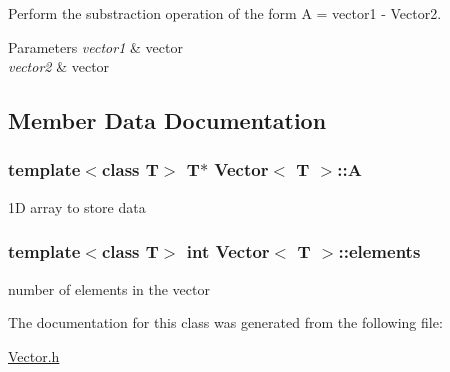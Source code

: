 Perform the substraction operation of the form A = vector1 -\/ Vector2. 


\begin{DoxyParams}{Parameters}
{\em vector1} & vector\\
\hline
{\em vector2} & vector \\
\hline
\end{DoxyParams}


\subsection{Member Data Documentation}
\hypertarget{class_vector_ac1512c9d8f28d4253e52967d64b803d9}{}
\subsubsection[{A}]{\setlength{\rightskip}{0pt plus 5cm}template$<$class T$>$ T$\ast$ {\bf Vector}$<$ T $>$\+::A\hspace{0.3cm}{\ttfamily [private]}}\label{class_vector_ac1512c9d8f28d4253e52967d64b803d9}


1\+D array to store data 

\hypertarget{class_vector_aac9657cb0934d133a2d9868f0661ac01}{}
\subsubsection[{elements}]{\setlength{\rightskip}{0pt plus 5cm}template$<$class T$>$ int {\bf Vector}$<$ T $>$\+::elements\hspace{0.3cm}{\ttfamily [private]}}\label{class_vector_aac9657cb0934d133a2d9868f0661ac01}


number of elements in the vector 



The documentation for this class was generated from the following file\+:\begin{DoxyCompactItemize}
\item 
\hyperlink{_vector_8h}{Vector.\+h}\end{DoxyCompactItemize}

